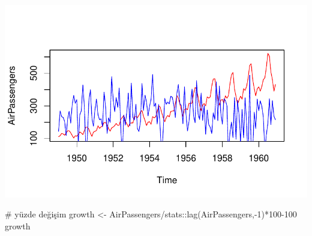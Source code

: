 \documentclass[
  letterpaper,
  DIV=11,
  numbers=noendperiod]{scrreprt}
\newenvironment{Shaded}{\begin{snugshade}}{\end{snugshade}}
\newcommand{\CommentTok}[1]{\textcolor[rgb]{0.37,0.37,0.37}{#1}}
\newcommand{\DecValTok}[1]{\textcolor[rgb]{0.68,0.00,0.00}{#1}}
\newcommand{\FunctionTok}[1]{\textcolor[rgb]{0.28,0.35,0.67}{#1}}
\newcommand{\NormalTok}[1]{\textcolor[rgb]{0.00,0.23,0.31}{#1}}
\newcommand{\OtherTok}[1]{\textcolor[rgb]{0.00,0.23,0.31}{#1}}
\newcommand{\SpecialCharTok}[1]{\textcolor[rgb]{0.37,0.37,0.37}{#1}}
\begin{document}
\includegraphics{data_analysis_files/figure-pdf/unnamed-chunk-5-7.pdf}

\begin{Shaded}
\begin{Highlighting}[]
\CommentTok{\# yüzde değişim}
\NormalTok{growth }\OtherTok{\textless{}{-}}\NormalTok{ AirPassengers}\SpecialCharTok{/}\NormalTok{stats}\SpecialCharTok{::}\FunctionTok{lag}\NormalTok{(AirPassengers,}\SpecialCharTok{{-}}\DecValTok{1}\NormalTok{)}\SpecialCharTok{*}\DecValTok{100{-}100}
\NormalTok{growth}
\end{Highlighting}
\end{Shaded}
\end{document}
